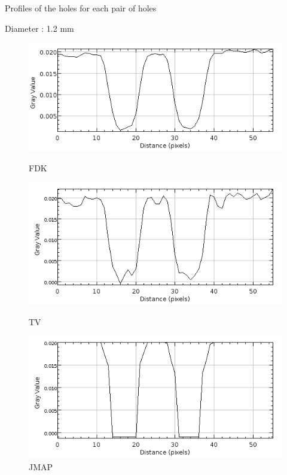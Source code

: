 \documentclass[latex]{beamer}
\begin{document}
\begin{frame}{Profiles of the holes for each pair of holes}
\begin{block}{Diameter : 1.2 mm}
\begin{figure}
\begin{minipage}[htb]{0.46\linewidth}
\centering
\includegraphics[scale=0.27]{ProfilsTrousIQICalculResolution/FDK/300proj/ProfilTrousTaille1.png}
\caption*{FDK}
\end{minipage} \hfill
\begin{minipage}[htb]{0.46\linewidth}
\centering
\includegraphics[scale=0.27]{ProfilsTrousIQICalculResolution/TV/300proj/ProfilTrousTaille1.png}
\caption*{TV}
\end{minipage} \vfill
\begin{minipage}[htb]{0.46\linewidth}
\centering
\includegraphics[scale=0.27]{ProfilsTrousIQICalculResolution/JMAPMGINonSplitGamma3K4/300proj/ProfilTrousTaille1.png}
\caption*{JMAP}
\end{minipage}
\end{figure}
\end{block}
\end{frame}
\end{document}
